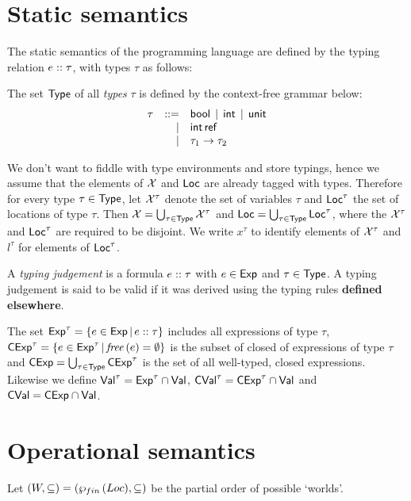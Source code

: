 \documentclass[12pt,a4paper]{report}
\newcommand{\CExp}{\sstyle{CExp}}
\newcommand{\CVal}{\sstyle{CVal}}
\begin{document}

\section{Static semantics}

The static semantics of the programming language are defined by the typing relation
${e}\mathrel{::}{\tau}$, with types $\tau$ as follows:

\begin{definition}[Types]
  The set $\mathsf{Type}$ of all {\em types} $\tau$ is defined by the context-free grammar below:
  \[\begin{array}{rrlll}
    \tau  & ::= & \mathsf{bool} \,\mid\, \mathsf{int} \,\mid\, \mathsf{unit}
          \\ & \mid & \mathsf{int}\,\mathsf{ref}
          \\ & \mid & \tau_1\to\tau_2
  \end{array}\]
\end{definition}

We don't want to fiddle with type environments and store typings, hence we assume that
the elements of $\mathcal{X}$ and $\mathsf{Loc}$ are already tagged with types. Therefore for every
type $\tau\in\mathsf{Type}$, let $\mathcal{X}^\tau$ denote the set of variables $\tau$ and $\mathsf{Loc}^\tau$ the
set of locations of type $\tau$. Then $\mathcal{X}=\bigcup_{\tau\in\mathsf{Type}}\mathcal{X}^\tau$ and
$\mathsf{Loc}=\bigcup_{\tau\in\mathsf{Type}}\mathsf{Loc}^\tau$, where the $\mathcal{X}^\tau$ and $\mathsf{Loc}^\tau$ are
required to be disjoint. We write $x^\tau$ to identify elements of $\mathcal{X}^\tau$ and
$l^\tau$ for elements of $\mathsf{Loc}^\tau$.

\begin{definition}
  A {\em typing judgement} is a formula ${e}\mathrel{::}{\tau}$ with
  $e\in\mathsf{Exp}$ and $\tau\in\mathsf{Type}$. A typing judgement is said to
  be valid if it was derived using the typing rules {\bf defined
  elsewhere}.
\end{definition}

The set $\mathsf{Exp}^\tau = \{e\in\mathsf{Exp}\,|\,{e}\mathrel{::}{\tau}\}$ includes all expressions of type $\tau$,
$\CExp^\tau = \{e\in\Exp^\tau\,|\,\free{e}=\emptyset\}$ is the subset of closed of expressions of
type $\tau$ and $\CExp = \bigcup_{\tau\in\Type} \CExp^\tau$ is the set of all well-typed, closed
expressions. Likewise we define $\mathsf{Val}^\tau = \mathsf{Exp}^\tau\cap\mathsf{Val}$, $\CVal^\tau = \CExp^\tau \cap \Val$
and $\CVal = \CExp \cap \Val$.



\section{Operational semantics}

Let $(W,\subseteq) = (\wp_{fin}\,(Loc),\subseteq)$ be the partial order of possible `worlds'.
\end{document}
